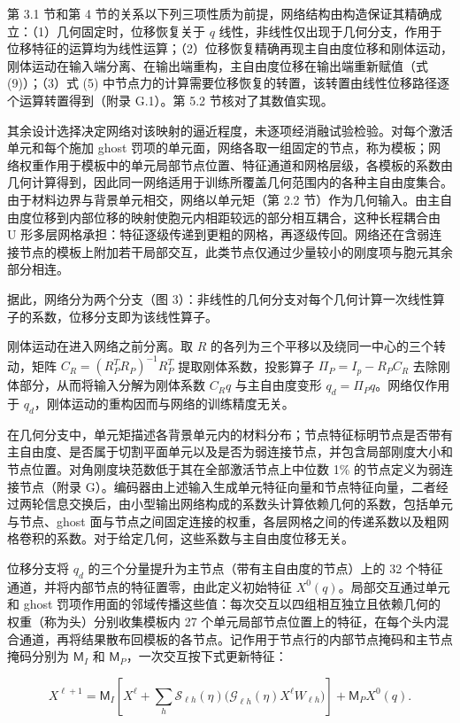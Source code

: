 \documentclass[preprint,12pt,authoryear]{elsarticle}
\begin{document}
第 3.1 节和第 4 节的关系以下列三项性质为前提，网络结构由构造保证其精确成立：（1）几何固定时，位移恢复关于 \(q\) 线性，非线性仅出现于几何分支，作用于位移特征的运算均为线性运算；（2）位移恢复精确再现主自由度位移和刚体运动，刚体运动在输入端分离、在输出端重构，主自由度位移在输出端重新赋值（式 (9)）；（3）式 (5) 中节点力的计算需要位移恢复的转置，该转置由线性位移路径逐个运算转置得到（附录 G.1）。第 5.2 节核对了其数值实现。

其余设计选择决定网络对该映射的逼近程度，未逐项经消融试验检验。对每个激活单元和每个施加 ghost 罚项的单元面，网络各取一组固定的节点，称为模板；网络权重作用于模板中的单元局部节点位置、特征通道和网格层级，各模板的系数由几何计算得到，因此同一网络适用于训练所覆盖几何范围内的各种主自由度集合。由于材料边界与背景单元相交，网络以单元矩（第 2.2 节）作为几何输入。由主自由度位移到内部位移的映射使胞元内相距较远的部分相互耦合，这种长程耦合由 U 形多层网格承担：特征逐级传递到更粗的网格，再逐级传回。网络还在含弱连接节点的模板上附加若干局部交互，此类节点仅通过少量较小的刚度项与胞元其余部分相连。

据此，网络分为两个分支（图 3）：非线性的几何分支对每个几何计算一次线性算子的系数，位移分支即为该线性算子。

刚体运动在进入网络之前分离。取 \(R\) 的各列为三个平移以及绕同一中心的三个转动，矩阵 \(C_R=(R_P^TR_P)^{-1}R_P^T\) 提取刚体系数，投影算子 \(\Pi_P=I_p-R_PC_R\) 去除刚体部分，从而将输入分解为刚体系数 \(C_Rq\) 与主自由度变形 \(q_d=\Pi_Pq\)。网络仅作用于 \(q_d\)，刚体运动的重构因而与网络的训练精度无关。

在几何分支中，单元矩描述各背景单元内的材料分布；节点特征标明节点是否带有主自由度、是否属于切割平面单元以及是否为弱连接节点，并包含局部刚度大小和节点位置。对角刚度块范数低于其在全部激活节点上中位数 1\% 的节点定义为弱连接节点（附录 G）。编码器由上述输入生成单元特征向量和节点特征向量，二者经过两轮信息交换后，由小型输出网络构成的系数头计算依赖几何的系数，包括单元与节点、ghost 面与节点之间固定连接的权重，各层网格之间的传递系数以及粗网格卷积的系数。对于给定几何，这些系数与主自由度位移无关。

位移分支将 \(q_d\) 的三个分量提升为主节点（带有主自由度的节点）上的 32 个特征通道，并将内部节点的特征置零，由此定义初始特征 \(X^0(q)\)。局部交互通过单元和 ghost 罚项作用面的邻域传播这些值：每次交互以四组相互独立且依赖几何的权重（称为头）分别收集模板内 27 个单元局部节点位置上的特征，在每个头内混合通道，再将结果散布回模板的各节点。记作用于节点行的内部节点掩码和主节点掩码分别为 \(\mathsf M_I\) 和 \(\mathsf M_P\)，一次交互按下式更新特征：

\[
X^{\ell+1}=\mathsf M_I\left[X^\ell+
 \sum_h\mathcal S_{\ell h}(\eta)
   \big(\mathcal G_{\ell h}(\eta)X^\ell W_{\ell h}\big)\right]
 +\mathsf M_PX^0(q).
\tag{8}
\]
\end{document}
